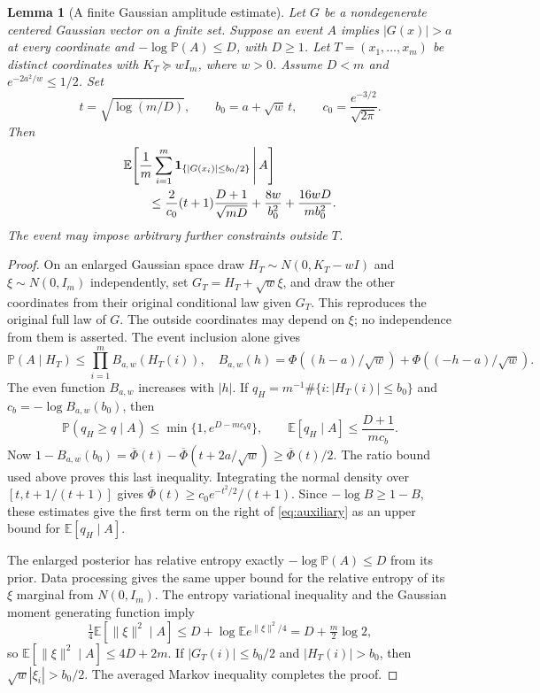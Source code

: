 \documentclass[11pt]{article}
\newtheorem{lemma}[theorem]{Lemma}
\theoremstyle{remark}\newtheorem{remark}[theorem]{Remark}
\newcommand{\E}{\mathbb E}
\newcommand{\Pp}{\mathbb P}
\begin{document}
\begin{lemma}[A finite Gaussian amplitude estimate]\label{lem:auxiliary}
Let $G$ be a nondegenerate centered Gaussian vector on a finite set. Suppose an event $A$ implies $|G(x)|>a$ at every coordinate and $-\log\Pp(A)\le D$, with $D\ge1$. Let $T=(x_1,\ldots,x_m)$ be distinct coordinates with $K_T\succeq wI_m$, where $w>0$. Assume $D<m$ and $e^{-2a^2/w}\le1/2$. Set
\[
 t=\sqrt{\log(m/D)},\qquad b_0=a+\sqrt w\,t,\qquad c_0=\frac{e^{-3/2}}{\sqrt{2\pi}}.
\]
Then
\begin{align}\label{eq:auxiliary}
 &\E\!\left[\frac1m\sum_{i=1}^m\mathbf1_{\{|G(x_i)|\le b_0/2\}}\,\middle|\,A\right]\\
 &\qquad\le \frac2{c_0}(t+1)\frac{D+1}{\sqrt{mD}}+\frac{8w}{b_0^2}+\frac{16wD}{mb_0^2}.\notag
\end{align}
The event may impose arbitrary further constraints outside $T$.
\end{lemma}
\begin{proof}
On an enlarged Gaussian space draw $H_T\sim N(0,K_T-wI)$ and $\xi\sim N(0,I_m)$ independently, set $G_T=H_T+\sqrt w\xi$, and draw the other coordinates from their original conditional law given $G_T$. This reproduces the original full law of $G$. The outside coordinates may depend on $\xi$; no independence from them is asserted. The event inclusion alone gives
\[
 \Pp(A\mid H_T)\le\prod_{i=1}^m B_{a,w}(H_T(i)),\quad
 B_{a,w}(h)=\Phi((h-a)/\sqrt w)+\Phi((-h-a)/\sqrt w).
\]
The even function $B_{a,w}$ increases with $|h|$. If $q_H=m^{-1}\#\{i:|H_T(i)|\le b_0\}$ and $c_b=-\log B_{a,w}(b_0)$, then
\[
 \Pp(q_H\ge q\mid A)\le\min\{1,e^{D-mc_bq}\},\qquad
 \E[q_H\mid A]\le\frac{D+1}{mc_b}.
\]
Now $1-B_{a,w}(b_0)=\overline\Phi(t)-\overline\Phi(t+2a/\sqrt w)\ge\overline\Phi(t)/2$. The ratio bound used above proves this last inequality. Integrating the normal density over $[t,t+1/(t+1)]$ gives $\overline\Phi(t)\ge c_0 e^{-t^2/2}/(t+1)$. Since $-\log B\ge1-B$, these estimates give the first term on the right of \eqref{eq:auxiliary} as an upper bound for $\E[q_H\mid A]$.

The enlarged posterior has relative entropy exactly $-\log\Pp(A)\le D$ from its prior. Data processing gives the same upper bound for the relative entropy of its $\xi$ marginal from $N(0,I_m)$. The entropy variational inequality and the Gaussian moment generating function imply
\[
 \tfrac14\E[\|\xi\|^2\mid A]\le D+\log\E e^{\|\xi\|^2/4}=D+\tfrac m2\log2,
\]
so $\E[\|\xi\|^2\mid A]\le4D+2m$. If $|G_T(i)|\le b_0/2$ and $|H_T(i)|>b_0$, then $\sqrt w|\xi_i|>b_0/2$. The averaged Markov inequality completes the proof.
\end{proof}
\end{document}
